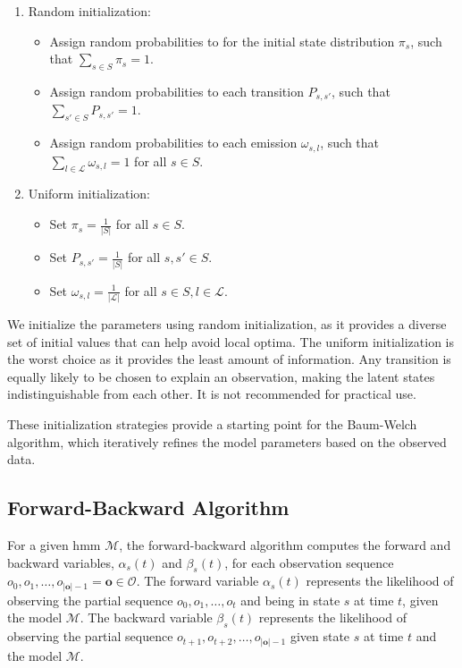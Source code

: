 \begin{enumerate}
    \item Random initialization: 
    \begin{itemize}
        \item Assign random probabilities to for the initial state distribution $\pi_s$, such that $\sum_{s \in S} \pi_s = 1$.
        \item Assign random probabilities to each transition $P_{s, s'}$, such that $\sum_{s' \in S} P_{s, s'} = 1$.
        \item Assign random probabilities to each emission $\omega_{s, l}$, such that $\sum_{l \in \mathcal{L}} \omega_{s, l} = 1$ for all $s \in S$.
    \end{itemize}
    \item Uniform initialization: 
    \begin{itemize}
        \item Set $\pi_s = \frac{1}{|S|}$ for all $s \in S$.
        \item Set $P_{s, s'} = \frac{1}{|S|}$ for all $s, s' \in S$.
        \item Set $\omega_{s, l} = \frac{1}{|\mathcal{L}|}$ for all $s \in S, l \in \mathcal{L}$.
    \end{itemize}
\end{enumerate}

We initialize the parameters using random initialization, as it provides a diverse set of initial values that can help avoid local optima.
The uniform initialization is the worst choice as it provides the least amount of information. 
Any transition is equally likely to be chosen to explain an observation, making the latent states indistinguishable from each other. 
It is not recommended for practical use.

These initialization strategies provide a starting point for the Baum-Welch algorithm, which iteratively refines the model parameters based on the observed data.

\subsection{Forward-Backward Algorithm}\label{subsec:forward-backwards_algorithm}
For a given \gls{hmm} $\mathcal{M}$, the forward-backward algorithm computes the forward and backward variables, $\alpha_s(t)$ and $\beta_s(t)$, for each observation sequence $o_0, o_1, \dots, o_{|\mathbf{o}|-1} = \mathbf{o} \in \mathcal{O}$.
The forward variable $\alpha_s(t)$ represents the likelihood of observing the partial sequence $o_0, o_1, \dots, o_t$ and being in state $s$ at time $t$, given the model $\mathcal{M}$.
The backward variable $\beta_s(t)$ represents the likelihood of observing the partial sequence $o_{t+1}, o_{t+2}, \dots, o_{|\mathbf{o}|-1}$ given state $s$ at time $t$ and the model $\mathcal{M}$.


